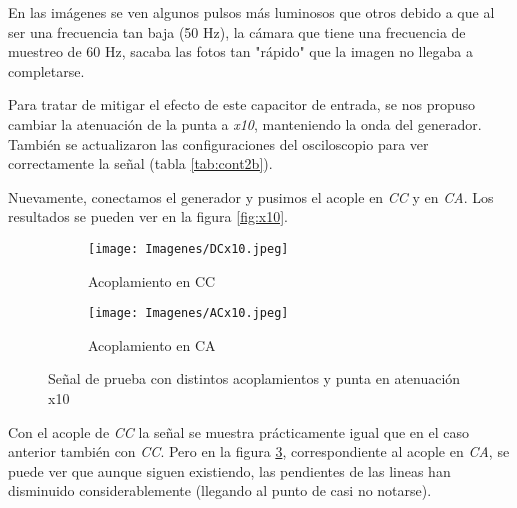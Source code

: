 En las imágenes se ven algunos pulsos más luminosos que otros debido a que al ser una frecuencia tan baja (50 Hz), la cámara que tiene una frecuencia de muestreo de 60 Hz, sacaba las fotos tan "rápido" que la imagen no llegaba a completarse.  

Para tratar de mitigar el efecto de este capacitor de entrada, se nos propuso cambiar la atenuación de la punta a \textit{x10}, manteniendo la onda del generador. También se actualizaron las configuraciones del osciloscopio para ver correctamente la señal (tabla \ref{tab:cont2b}).

\begin{table}[H]
    \centering
        \def\tablename{Tabla} 
        \caption{Cuadro de Controles}
        \label{tab:cont2b}
\end{table}

Nuevamente, conectamos el generador y pusimos el acople en \textit{CC} y en \textit{CA}. Los resultados se pueden ver en la figura \ref{fig:x10}.


\begin{figure}[H]
    \label{fig:x10}
    \begin{center}
        \begin{subfigure}[b]{0.5\textwidth}
        \centering  
            \texttt{[image: Imagenes/DCx10.jpeg]}
        \caption{Acoplamiento en CC}
        \label{dcx10}
    \end{subfigure}
    \hfill
    \begin{subfigure}[b]{0.49\textwidth}
        \centering
            \texttt{[image: Imagenes/ACx10.jpeg]}
        \caption{Acoplamiento en CA}
        \label{acx10}
    \end{subfigure}
    \caption{Señal de prueba con distintos acoplamientos y punta en atenuación x10}
    \end{center}
\end{figure}

Con el acople de \textit{CC} la señal se muestra prácticamente igual que en el caso anterior también con \textit{CC}. Pero en la figura \ref{acx10}, correspondiente al acople en \textit{CA}, se puede ver que aunque siguen existiendo, las pendientes de las lineas han disminuido considerablemente (llegando al punto de casi no notarse). 



